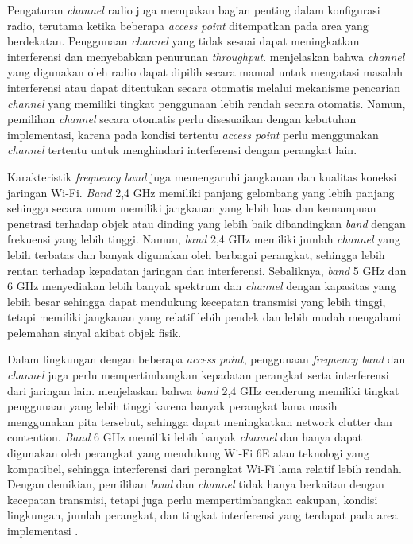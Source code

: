 Pengaturan \textit{channel} radio juga merupakan bagian penting dalam konfigurasi radio, terutama ketika beberapa \textit{access point} ditempatkan pada area yang berdekatan. Penggunaan \textit{channel} yang tidak sesuai dapat meningkatkan interferensi dan menyebabkan penurunan \textit{throughput}. \textcite{CISCO_RADIO_CONFIGURATION_2002} menjelaskan bahwa \textit{channel} yang digunakan oleh radio dapat dipilih secara manual untuk mengatasi masalah interferensi atau dapat ditentukan secara otomatis melalui mekanisme pencarian \textit{channel} yang memiliki tingkat penggunaan lebih rendah secara otomatis. Namun, pemilihan \textit{channel} secara otomatis perlu disesuaikan dengan kebutuhan implementasi, karena pada kondisi tertentu \textit{access point} perlu menggunakan \textit{channel} tertentu untuk menghindari interferensi dengan perangkat lain.

Karakteristik \textit{frequency band} juga memengaruhi jangkauan dan kualitas koneksi jaringan Wi-Fi. \textit{Band} 2,4 GHz memiliki panjang gelombang yang lebih panjang sehingga secara umum memiliki jangkauan yang lebih luas dan kemampuan penetrasi terhadap objek atau dinding yang lebih baik dibandingkan \textit{band} dengan frekuensi yang lebih tinggi. Namun, \textit{band} 2,4 GHz memiliki jumlah \textit{channel} yang lebih terbatas dan banyak digunakan oleh berbagai perangkat, sehingga lebih rentan terhadap kepadatan jaringan dan interferensi. Sebaliknya, \textit{band} 5 GHz dan 6 GHz menyediakan lebih banyak spektrum dan \textit{channel} dengan kapasitas yang lebih besar sehingga dapat mendukung kecepatan transmisi yang lebih tinggi, tetapi memiliki jangkauan yang relatif lebih pendek dan lebih mudah mengalami pelemahan sinyal akibat objek fisik. 

Dalam lingkungan dengan beberapa \textit{access point}, penggunaan \textit{frequency band} dan \textit{channel} juga perlu mempertimbangkan kepadatan perangkat serta interferensi dari jaringan lain. \textcite{INTEL_24_5_6GHZ} menjelaskan bahwa \textit{band} 2,4 GHz cenderung memiliki tingkat penggunaan yang lebih tinggi karena banyak perangkat lama masih menggunakan pita tersebut, sehingga dapat meningkatkan network clutter dan contention. \textit{Band} 6 GHz memiliki lebih banyak \textit{channel} dan hanya dapat digunakan oleh perangkat yang mendukung Wi-Fi 6E atau teknologi yang kompatibel, sehingga interferensi dari perangkat Wi-Fi lama relatif lebih rendah. Dengan demikian, pemilihan \textit{band} dan \textit{channel} tidak hanya berkaitan dengan kecepatan transmisi, tetapi juga perlu mempertimbangkan cakupan, kondisi lingkungan, jumlah perangkat, dan tingkat interferensi yang terdapat pada area implementasi \parencite{INTEL_24_5_6GHZ}.

